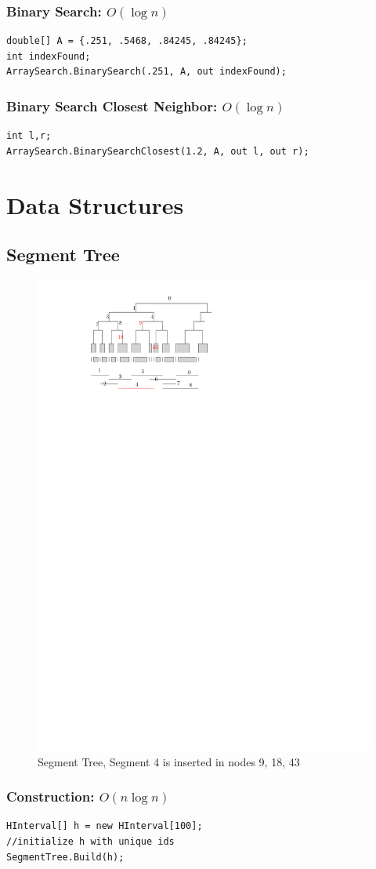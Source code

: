 \documentclass{article}
\begin{document}
\subsubsection{Binary Search: $O(\log n)$}            \begin{lstlisting}
double[] A = {.251, .5468, .84245, .84245};            
int indexFound;
ArraySearch.BinarySearch(.251, A, out indexFound); 
\end{lstlisting}
\subsubsection{Binary Search Closest Neighbor: $O(\log n)$}           
\begin{lstlisting}
int l,r;
ArraySearch.BinarySearchClosest(1.2, A, out l, out r);
\end{lstlisting}



\newpage
\section{Data Structures}
\subsection{Segment Tree}
\begin{figure}[h]
\centering
\includegraphics[width=.5\textwidth]{Figures/segmenttree.pdf}
\caption{Segment Tree, Segment 4 is inserted in nodes 9, 18, 43}
\label{fig:NearestNeighborinaCone}
\end{figure}


\subsubsection{Construction: $O(n\log n)$}
\begin{lstlisting}
HInterval[] h = new HInterval[100];
//initialize h with unique ids
SegmentTree.Build(h);
\end{lstlisting}
\end{document}
